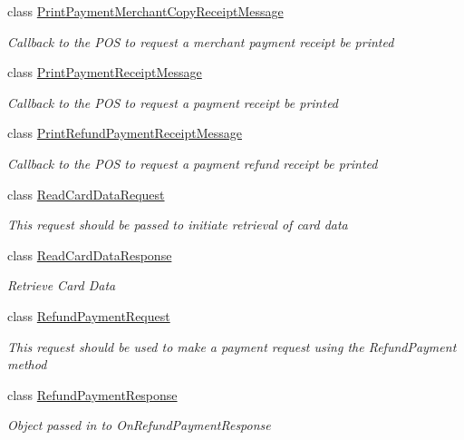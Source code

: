 \begin{DoxyCompactItemize}
class \hyperlink{classcom_1_1clover_1_1remotepay_1_1sdk_1_1_print_payment_merchant_copy_receipt_message}{Print\+Payment\+Merchant\+Copy\+Receipt\+Message}
\begin{DoxyCompactList}\small\item\em Callback to the P\+OS to request a merchant payment receipt be printed \end{DoxyCompactList}\item 
class \hyperlink{classcom_1_1clover_1_1remotepay_1_1sdk_1_1_print_payment_receipt_message}{Print\+Payment\+Receipt\+Message}
\begin{DoxyCompactList}\small\item\em Callback to the P\+OS to request a payment receipt be printed \end{DoxyCompactList}\item 
class \hyperlink{classcom_1_1clover_1_1remotepay_1_1sdk_1_1_print_refund_payment_receipt_message}{Print\+Refund\+Payment\+Receipt\+Message}
\begin{DoxyCompactList}\small\item\em Callback to the P\+OS to request a payment refund receipt be printed \end{DoxyCompactList}\item 
class \hyperlink{classcom_1_1clover_1_1remotepay_1_1sdk_1_1_read_card_data_request}{Read\+Card\+Data\+Request}
\begin{DoxyCompactList}\small\item\em This request should be passed to initiate retrieval of card data \end{DoxyCompactList}\item 
class \hyperlink{classcom_1_1clover_1_1remotepay_1_1sdk_1_1_read_card_data_response}{Read\+Card\+Data\+Response}
\begin{DoxyCompactList}\small\item\em Retrieve Card Data \end{DoxyCompactList}\item 
class \hyperlink{classcom_1_1clover_1_1remotepay_1_1sdk_1_1_refund_payment_request}{Refund\+Payment\+Request}
\begin{DoxyCompactList}\small\item\em This request should be used to make a payment request using the Refund\+Payment method \end{DoxyCompactList}\item 
class \hyperlink{classcom_1_1clover_1_1remotepay_1_1sdk_1_1_refund_payment_response}{Refund\+Payment\+Response}
\begin{DoxyCompactList}\small\item\em Object passed in to On\+Refund\+Payment\+Response \end{DoxyCompactList}\item 

\end{DoxyCompactItemize}
